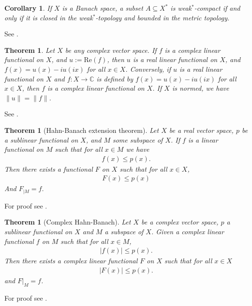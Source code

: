 \documentclass[10pt,twoside,openany,final]{memoir}
\theoremstyle{break}
\newtheorem{theorem}[section]{Theorem}
\newtheorem{corollary}[section]{Corollary}
\theoremstyle{Break}
\newcommand{\lv}{\lVert}
\newcommand{\rv}{\rVert}
\newcommand{\C}{\mathbb{C}}
\begin{document}
\begin{corollary}\label{V.4.3}
If $X$ is a Banach space, a subset $A\subseteq X^*$ is weak$^*$-compact if and only if it is closed in the weak$^*$-topology and bounded in the metric topology.
\end{corollary}
\noindent See \cite[Corollary 3][424]{dunford1971linear}.

\begin{theorem}\label{complex real functionals} \label{hahnbanach real}
Let $X$ be any complex vector space. If $f$ is a complex linear functional on $X$, and $u:=\text{Re}(f)$, then $u$ is a real linear functional on $X$, and $f(x)=u(x)-iu(ix)$ for all $x \in X$. Conversely, if $u$ is a real linear functional on $X$ and $f\colon X \to \C$ is defined by $f(x)=u(x)-iu(ix)$ for all $x \in X$, then $f$ is a complex linear functional on $X$. If $X$ is normed, we have $\lv u \rv = \lv f \rv$.
\end{theorem}
\noindent See \cite[Proposition 5.5][157]{folland2013real}.

\begin{theorem}[Hahn-Banach extension theorem]
Let $X$ be a real vector space, $p$ be a sublinear functional on $X$, and $M$ some subspace of $X$. If $f$ is a linear functional on $M$ such that for all $x \in M$ we have
\begin{align*}
f(x) \leq p(x).
\end{align*}
Then there exists a functional $F$ on $X$ such that for all $x \in X$,
\begin{align*}
F(x) \leq p(x)
\end{align*}
And $F_{|M}=f$.
\end{theorem}
\noindent For proof see \cite[Theorem 5.6][157]{folland2013real}.

\begin{theorem}[Complex Hahn-Banach]
Let $X$ be a complex vector space, $p$ a sublinear functional on $X$ and $M$ a subspace of $X$. Given a complex linear functional $f$ on $M$ such that for all $x \in M$,
\begin{align*}
|f(x)| \leq p(x).
\end{align*}
Then there exists a complex linear functional $F$ on $X$ such that for all $x \in X$
\begin{align*}
|F(x)| \leq p(x).
\end{align*}
and $F|_{M}=f$.
\end{theorem}
\noindent For proof see \cite[Theorem 5.7][158]{folland2013real}.
\end{document}
